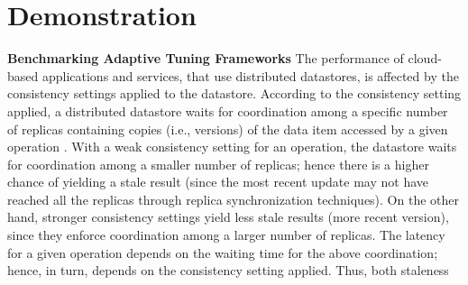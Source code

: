 \documentclass{vldb}
\begin{document}

\section{Demonstration}
 \textbf{Benchmarking Adaptive Tuning Frameworks}
  The performance of cloud-based applications and services, that use distributed datastores, is affected by the consistency
 settings applied to the datastore. According to the consistency setting applied, a distributed datastore waits for coordination
     among a specific number of replicas containing copies (i.e., versions) of the data item accessed by a given operation \cite{conf/sigmod/Sivasubramanian12}. %
      With a weak consistency
  setting for an operation, the datastore waits for coordination among  a smaller number of replicas; hence there is a higher chance of yielding
   a stale result (since the most recent update may not have reached all the replicas through replica synchronization techniques).
   On the other hand, stronger consistency settings yield less stale results (more recent version), since they enforce coordination among a larger number of replicas.
    The latency for
      a given operation depends on the waiting time for the above coordination; hence, in turn, depends on the
       consistency setting applied. %
 Thus, both staleness
\end{document}
